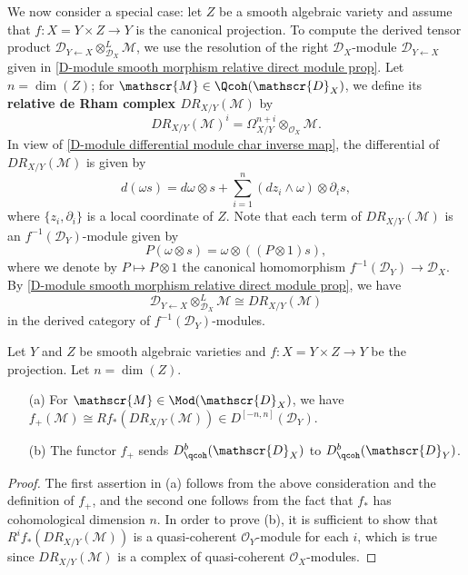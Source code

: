 We now consider a special case: let $Z$ be a smooth algebraic variety and assume that $f:X=Y\times Z\to Y$ is the canonical projection. To compute the derived tensor product $\mathscr{D}_{Y\leftarrow X}\otimes_{\mathscr{D}_X}^L\mathscr{M}$, we use the resolution of the right $\mathscr{D}_X$-module $\mathscr{D}_{Y\leftarrow X}$ given in \cref{D-module smooth morphism relative direct module prop}. Let $n=\dim(Z)$; for $\mathscr{M}\in\Qcoh(\mathscr{D}_X)$, we define its \textbf{relative de Rham complex $DR_{X/Y}(\mathscr{M})$} by
\[DR_{X/Y}(\mathscr{M})^i=\Omega_{X/Y}^{n+i}\otimes_{\mathscr{O}_X}\mathscr{M}.\]
In view of \cref{D-module differential module char inverse map}, the differential of $DR_{X/Y}(\mathscr{M})$ is given by
\[d(\omega s)=d\omega\otimes s+\sum_{i=1}^{n}(dz_i\wedge\omega)\otimes\partial_is,\]
where $\{z_i,\partial_i\}$ is a local coordinate of $Z$. Note that each term of $DR_{X/Y}(\mathscr{M})$ is an $f^{-1}(\mathscr{D}_Y)$-module given by
\[P(\omega\otimes s)=\omega\otimes ((P\otimes 1)s),\]
where we denote by $P\mapsto P\otimes 1$ the canonical homomorphism $f^{-1}(\mathscr{D}_Y)\to\mathscr{D}_X$. By \cref{D-module smooth morphism relative direct module prop}, we have
\[\mathscr{D}_{Y\leftarrow X}\otimes_{\mathscr{D}_X}^L\mathscr{M}\cong DR_{X/Y}(\mathscr{M})\]
in the derived category of $f^{-1}(\mathscr{D}_Y)$-modules.

\begin{proposition}\label{D-module projection direct image prop}
Let $Y$ and $Z$ be smooth algebraic varieties and $f:X=Y\times Z\to Y$ be the projection. Let $n=\dim(Z)$.
\begin{enumerate}
    \item[(a)] For $\mathscr{M}\in\Mod(\mathscr{D}_X)$, we have $f_+(\mathscr{M})\cong Rf_*(DR_{X/Y}(\mathscr{M}))\in D^{[-n,n]}(\mathscr{D}_Y)$.
    \item[(b)] The functor $f_+$ sends $D^b_{\qcoh}(\mathscr{D}_X)$ to $D^b_{\qcoh}(\mathscr{D}_Y)$.
\end{enumerate}
\end{proposition}
\begin{proof}
The first assertion in (a) follows from the above consideration and the definition of $f_+$, and the second one follows from the fact that $f_*$ has cohomological dimension $n$. In order to prove (b), it is sufficient to show that $R^if_*(DR_{X/Y}(\mathscr{M}))$ is a quasi-coherent $\mathscr{O}_Y$-module for each $i$, which is true since $DR_{X/Y}(\mathscr{M})$ is a complex of quasi-coherent $\mathscr{O}_X$-modules.   
\end{proof}


